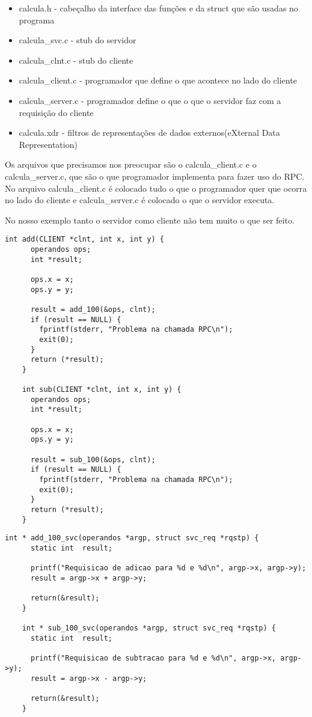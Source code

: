 \documentclass[12pt,a4paper]{article}
\begin{document}
\begin{itemize}
	\item calcula.h - cabeçalho da interface das funções e da struct que são usadas no programa
	\item calcula\_svc.c - stub do servidor
	\item calcula\_clnt.c - stub do cliente
	\item calcula\_client.c - programador que define o que acontece no lado do cliente
	\item calcula\_server.c - programador define o que o que o servidor faz com a requisição do cliente
	\item calcula.xdr - filtros de representações de dados externos(eXternal Data Representation)
\end{itemize}

Os arquivos que precisamos nos preocupar são o calcula\_client.c e o calcula\_server.c, que são
o que programador implementa para fazer uso do RPC. No arquivo calcula\_client.c é colocado tudo
o que o programador quer que ocorra no lado do cliente e calcula\_server.c é colocado o que 
o servidor executa.

No nosso exemplo tanto o servidor como cliente não tem muito o que ser feito.

\begin{lstlisting}[caption=client\_client.c]
	int add(CLIENT *clnt, int x, int y) {
	  operandos ops;
	  int *result;

	  ops.x = x;
	  ops.y = y;

	  result = add_100(&ops, clnt);
	  if (result == NULL) {
	    fprintf(stderr, "Problema na chamada RPC\n");
	    exit(0);
	  }
	  return (*result);
	}

	int sub(CLIENT *clnt, int x, int y) {
	  operandos ops;
	  int *result;

	  ops.x = x;
	  ops.y = y;

	  result = sub_100(&ops, clnt);
	  if (result == NULL) {
	    fprintf(stderr, "Problema na chamada RPC\n");
	    exit(0);
	  }
	  return (*result);
	}
\end{lstlisting}

\begin{lstlisting}[caption=calcula\_server.c]
	int * add_100_svc(operandos *argp, struct svc_req *rqstp) {
	  static int  result;

	  printf("Requisicao de adicao para %d e %d\n", argp->x, argp->y);
	  result = argp->x + argp->y;
  
	  return(&result);
	}

	int * sub_100_svc(operandos *argp, struct svc_req *rqstp) {
	  static int  result;
  
	  printf("Requisicao de subtracao para %d e %d\n", argp->x, argp->y);
	  result = argp->x - argp->y;
  
	  return(&result);
	}
\end{lstlisting}
\end{document}
